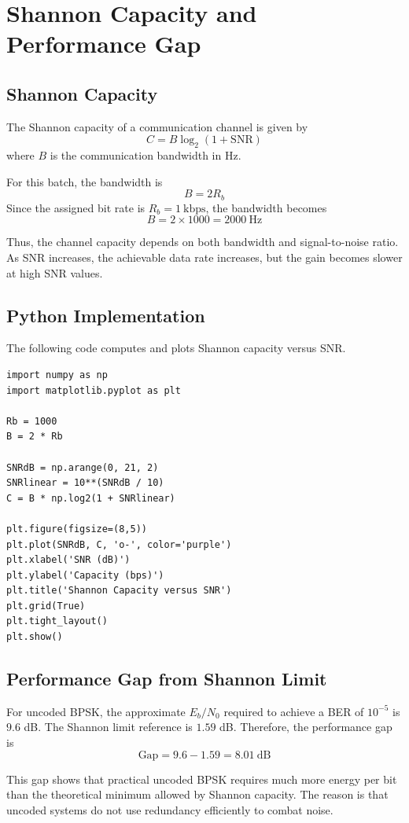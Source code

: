 \chapter{Shannon Capacity and Performance Gap}

\section{Shannon Capacity}
The Shannon capacity of a communication channel is given by
\[
C = B \log_2(1+\text{SNR})
\]
where \(B\) is the communication bandwidth in Hz.

For this batch, the bandwidth is
\[
B = 2R_b
\]
Since the assigned bit rate is \(R_b = 1~\text{kbps}\), the bandwidth becomes
\[
B = 2 \times 1000 = 2000~\text{Hz}
\]

Thus, the channel capacity depends on both bandwidth and signal-to-noise ratio. As SNR increases, the achievable data rate increases, but the gain becomes slower at high SNR values.
\newpage
\section{Python Implementation}
The following code computes and plots Shannon capacity versus SNR.

\begin{lstlisting}[style=pythonstyle, caption={Shannon Capacity Calculation and Plot}]
import numpy as np
import matplotlib.pyplot as plt

Rb = 1000
B = 2 * Rb

SNRdB = np.arange(0, 21, 2)
SNRlinear = 10**(SNRdB / 10)
C = B * np.log2(1 + SNRlinear)

plt.figure(figsize=(8,5))
plt.plot(SNRdB, C, 'o-', color='purple')
plt.xlabel('SNR (dB)')
plt.ylabel('Capacity (bps)')
plt.title('Shannon Capacity versus SNR')
plt.grid(True)
plt.tight_layout()
plt.show()
\end{lstlisting}

\section{Performance Gap from Shannon Limit}
For uncoded BPSK, the approximate \(E_b/N_0\) required to achieve a BER of \(10^{-5}\) is \(9.6\) dB. The Shannon limit reference is \(1.59\) dB. Therefore, the performance gap is
\[
\text{Gap} = 9.6 - 1.59 = 8.01~\text{dB}
\]

This gap shows that practical uncoded BPSK requires much more energy per bit than the theoretical minimum allowed by Shannon capacity. The reason is that uncoded systems do not use redundancy efficiently to combat noise.

